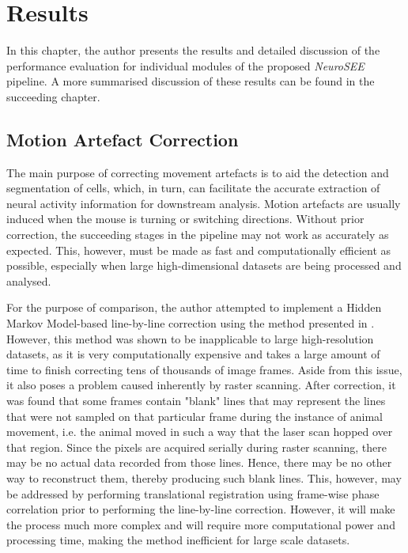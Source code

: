 \chapter{Results}
\hspace{\parindent} In this chapter, the author presents the results and detailed discussion of the performance evaluation for individual modules of the proposed \textit{NeuroSEE} pipeline. A more summarised discussion of these results can be found in the succeeding chapter.

\section{Motion Artefact Correction}
\hspace{\parindent} The main purpose of correcting movement artefacts is to aid the detection and segmentation of cells, which, in turn, can facilitate the accurate extraction of neural activity information for downstream analysis. Motion artefacts are usually induced when the mouse is turning or switching directions. Without prior correction, the succeeding stages in the pipeline may not work as accurately as expected. This, however, must be made as fast and computationally efficient as possible, especially when large high-dimensional datasets are being processed and analysed. 

For the purpose of comparison, the author attempted to implement a Hidden Markov Model-based line-by-line correction using the method presented in \cite{dombeck2007imaging}. However, this method was shown to be inapplicable to large high-resolution datasets, as it is very computationally expensive and takes a large amount of time to finish correcting tens of thousands of image frames. Aside from this issue, it also poses a problem caused inherently by raster scanning. After correction, it was found that some frames contain "blank" lines that may represent the lines that were not sampled on that particular frame during the instance of animal movement, i.e. the animal moved in such a way that the laser scan hopped over that region. Since the pixels are acquired serially during raster scanning, there may be no actual data recorded from those lines. Hence, there may be no other way to reconstruct them, thereby producing such blank lines. This, however, may be addressed by performing translational registration using frame-wise phase correlation prior to performing the line-by-line correction. However, it will make the process much more complex and will require more computational power and processing time, making the method inefficient for large scale datasets. 

